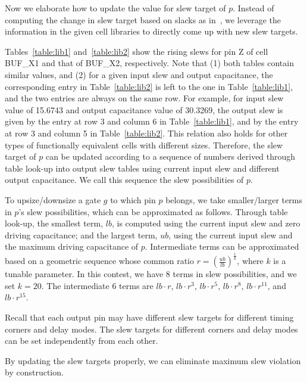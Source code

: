 Now we elaborate how to update the value for slew target of $p$. Instead of computing the change in slew target based on slacks as in~\cite{Held:Gate}, we leverage the information in the given cell libraries to directly come up with new slew targets.

Tables~\ref{table:lib1} and~\ref{table:lib2} show the rising slews for pin Z of cell BUF\_X1 and that of BUF\_X2, respectively. Note that (1) both tables contain similar values, and (2) for a given input slew and output capacitance, the corresponding entry in Table~\ref{table:lib2} is left to the one in Table~\ref{table:lib1}, and the two entries are always on the same row. For example, for input slew value of 15.6743 and output capacitance value of 30.3269, the output slew is given by the entry at row 3 and column 6 in Table~\ref{table:lib1}, and by the entry at row 3 and column 5 in Table~\ref{table:lib2}. This relation also holds for other types of functionally equivalent cells with different sizes. Therefore, the slew target of $p$ can be updated according to a sequence of numbers derived through table look-up into output slew tables using current input slew and different output capacitance. We call this sequence the slew possibilities of $p$.

To upsize/downsize a gate $g$ to which pin $p$ belongs, we take smaller/larger terms in $p$'s slew possibilities, which can be approximated as follows. Through table look-up, the smallest term, $lb$, is computed using the current input slew and zero driving capacitance; and the largest term, $ub$, using the current input slew and the maximum driving capacitance of $p$. Intermediate terms can be approximated based on a geometric sequence whose common ratio $r = (\frac{ub}{lb})^{\frac{1}{k}}$, where $k$ is a tunable parameter. In this contest, we have 8 terms in slew possibilities, and we set $k = 20$. The intermediate 6 terms are $lb\cdot r$, $lb\cdot r^3$, $lb\cdot r^5$, $lb\cdot r^8$, $lb\cdot r^{11}$, and $lb\cdot r^{15}$.

Recall that each output pin may have different slew targets for different timing corners and delay modes. The slew targets for different corners and delay modes can be set independently from each other.

By updating the slew targets properly, we can eliminate maximum slew violation by construction.

